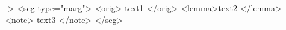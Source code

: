 



-> <seg type="marg">
        <orig> text1 </orig>
        <lemma>text2 </lemma>
        <note> text3 </note>
   </seg>
